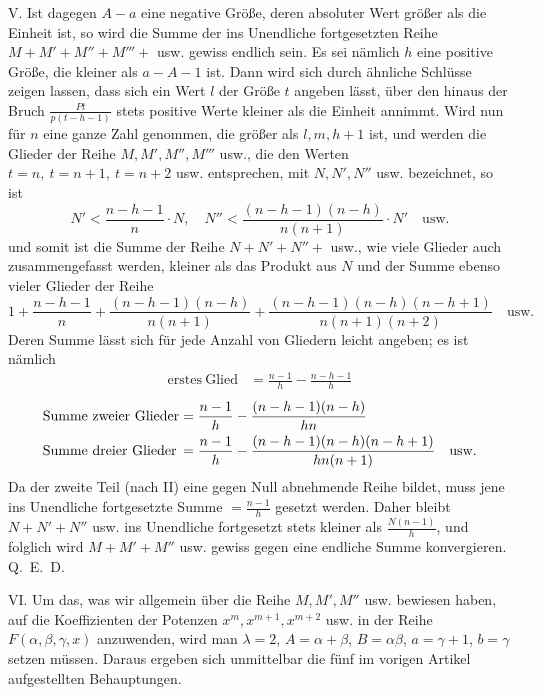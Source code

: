 V. Ist dagegen $A-a$ eine negative Größe, deren absoluter Wert größer als die Einheit ist, so wird die Summe der ins Unendliche fortgesetzten Reihe $M+M'+M''+M'''+$ usw. gewiss endlich sein. Es sei nämlich $h$ eine positive Größe, die kleiner als $a-A-1$ ist. Dann wird sich durch ähnliche Schlüsse zeigen lassen, dass sich ein Wert $l$ der Größe $t$ angeben lässt, über den hinaus der Bruch $\frac{Pt}{p(t-h-1)}$ stets positive Werte kleiner als die Einheit annimmt. Wird nun für $n$ eine ganze Zahl genommen, die größer als $l,m,h+1$ ist, und werden die Glieder der Reihe $M,M',M'',M'''$ usw., die den Werten $t=n,\ t=n+1,\ t=n+2$ usw. entsprechen, mit $N,N',N''$ usw. bezeichnet, so ist
\[
N'<\frac{n-h-1}{n}\cdot N,\quad
N''<\frac{(n-h-1)(n-h)}{n(n+1)}\cdot N'\quad\mathrm{usw.}
\]
und somit ist die Summe der Reihe $N+N'+N''+$ usw., wie viele Glieder auch zusammengefasst werden, kleiner als das Produkt aus $N$ und der Summe ebenso vieler Glieder der Reihe
\[
1+\frac{n-h-1}{n}+\frac{(n-h-1)(n-h)}{n(n+1)}+
\frac{(n-h-1)(n-h)(n-h+1)}{n(n+1)(n+2)}\quad\mathrm{usw.}
\]
Deren Summe lässt sich für jede Anzahl von Gliedern leicht angeben; es ist nämlich
\[
\begin{array}{lr}
\mathrm{erstes\ Glied}&=\displaystyle\frac{n-1}{h}-\frac{n-h-1}{h}
\end{array}
\]
\[
\begin{array}{@{}l@{\;}l@{}}
\text{Summe zweier Glieder}&=\displaystyle\frac{n-1}{h}-\frac{(n-h-1)(n-h)}{hn}\\[7pt]
\text{Summe dreier Glieder}&=\displaystyle\frac{n-1}{h}-\frac{(n-h-1)(n-h)(n-h+1)}{hn(n+1)}\quad\text{usw.}
\end{array}
\]
Da der zweite Teil (nach II) eine gegen Null abnehmende Reihe bildet, muss jene ins Unendliche fortgesetzte Summe $=\frac{n-1}{h}$ gesetzt werden. Daher bleibt $N+N'+N''$ usw. ins Unendliche fortgesetzt stets kleiner als $\frac{N(n-1)}{h}$, und folglich wird $M+M'+M''$ usw. gewiss gegen eine endliche Summe konvergieren. Q.~E.~D.

VI. Um das, was wir allgemein über die Reihe $M,M',M''$ usw. bewiesen haben, auf die Koeffizienten der Potenzen $x^m,x^{m+1},x^{m+2}$ usw. in der Reihe $F(\alpha,\beta,\gamma,x)$ anzuwenden, wird man $\lambda=2$, $A=\alpha+\beta$, $B=\alpha\beta$, $a=\gamma+1$, $b=\gamma$ setzen müssen. Daraus ergeben sich unmittelbar die fünf im vorigen Artikel aufgestellten Behauptungen.

